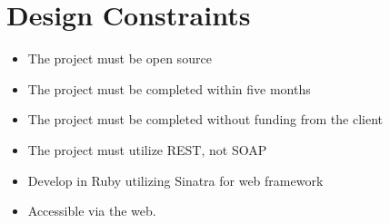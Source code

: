 \documentclass{article}
\begin{document}
\section{Design Constraints}
\begin{itemize}
\item The project must be open source
\item The project must be completed within five months
\item The project must be completed without funding from the client
\item The project must utilize REST, not SOAP
\item Develop in Ruby utilizing Sinatra for web framework
\item Accessible via the web.
\end{itemize} 
\end{document}
